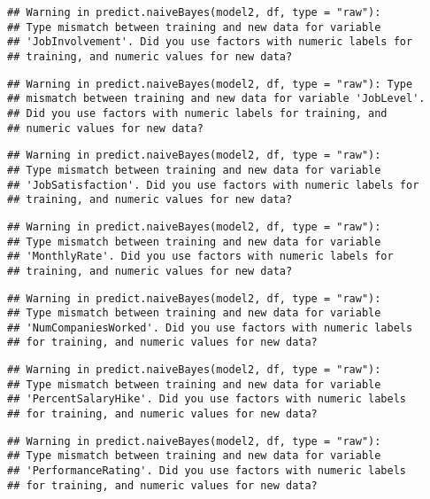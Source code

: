 \documentclass[
]{article}
\begin{document}
\begin{verbatim}
## Warning in predict.naiveBayes(model2, df, type = "raw"):
## Type mismatch between training and new data for variable
## 'JobInvolvement'. Did you use factors with numeric labels for
## training, and numeric values for new data?
\end{verbatim}

\begin{verbatim}
## Warning in predict.naiveBayes(model2, df, type = "raw"): Type
## mismatch between training and new data for variable 'JobLevel'.
## Did you use factors with numeric labels for training, and
## numeric values for new data?
\end{verbatim}

\begin{verbatim}
## Warning in predict.naiveBayes(model2, df, type = "raw"):
## Type mismatch between training and new data for variable
## 'JobSatisfaction'. Did you use factors with numeric labels for
## training, and numeric values for new data?
\end{verbatim}

\begin{verbatim}
## Warning in predict.naiveBayes(model2, df, type = "raw"):
## Type mismatch between training and new data for variable
## 'MonthlyRate'. Did you use factors with numeric labels for
## training, and numeric values for new data?
\end{verbatim}

\begin{verbatim}
## Warning in predict.naiveBayes(model2, df, type = "raw"):
## Type mismatch between training and new data for variable
## 'NumCompaniesWorked'. Did you use factors with numeric labels
## for training, and numeric values for new data?
\end{verbatim}

\begin{verbatim}
## Warning in predict.naiveBayes(model2, df, type = "raw"):
## Type mismatch between training and new data for variable
## 'PercentSalaryHike'. Did you use factors with numeric labels
## for training, and numeric values for new data?
\end{verbatim}

\begin{verbatim}
## Warning in predict.naiveBayes(model2, df, type = "raw"):
## Type mismatch between training and new data for variable
## 'PerformanceRating'. Did you use factors with numeric labels
## for training, and numeric values for new data?
\end{verbatim}
\end{document}
